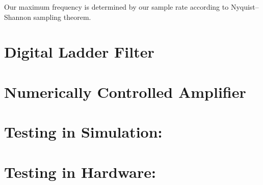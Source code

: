 \documentclass{article}
\begin{document}
        Our maximum frequency is determined by our sample rate according to
        Nyquist–Shannon sampling theorem. 

        \vspace{3mm}
        

    \section*{Digital Ladder Filter}

    \section*{Numerically Controlled Amplifier}

    \section*{Testing in Simulation:}
    
    \section*{Testing in Hardware:}
\end{document}
